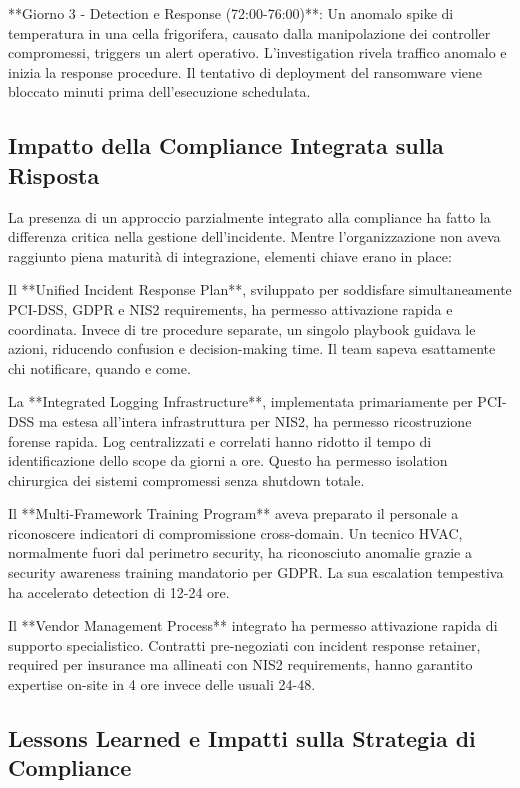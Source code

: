 **Giorno 3 - Detection e Response (72:00-76:00)**: Un anomalo spike di temperatura in una cella frigorifera, causato dalla manipolazione dei controller compromessi, triggers un alert operativo. L'investigation rivela traffico anomalo e inizia la response procedure. Il tentativo di deployment del ransomware viene bloccato minuti prima dell'esecuzione schedulata.

\subsection{Impatto della Compliance Integrata sulla Risposta}

La presenza di un approccio parzialmente integrato alla compliance ha fatto la differenza critica nella gestione dell'incidente. Mentre l'organizzazione non aveva raggiunto piena maturità di integrazione, elementi chiave erano in place:

Il **Unified Incident Response Plan**, sviluppato per soddisfare simultaneamente PCI-DSS, GDPR e NIS2 requirements, ha permesso attivazione rapida e coordinata. Invece di tre procedure separate, un singolo playbook guidava le azioni, riducendo confusion e decision-making time. Il team sapeva esattamente chi notificare, quando e come.

La **Integrated Logging Infrastructure**, implementata primariamente per PCI-DSS ma estesa all'intera infrastruttura per NIS2, ha permesso ricostruzione forense rapida. Log centralizzati e correlati hanno ridotto il tempo di identificazione dello scope da giorni a ore. Questo ha permesso isolation chirurgica dei sistemi compromessi senza shutdown totale.

Il **Multi-Framework Training Program** aveva preparato il personale a riconoscere indicatori di compromissione cross-domain. Un tecnico HVAC, normalmente fuori dal perimetro security, ha riconosciuto anomalie grazie a security awareness training mandatorio per GDPR. La sua escalation tempestiva ha accelerato detection di 12-24 ore.

Il **Vendor Management Process** integrato ha permesso attivazione rapida di supporto specialistico. Contratti pre-negoziati con incident response retainer, required per insurance ma allineati con NIS2 requirements, hanno garantito expertise on-site in 4 ore invece delle usuali 24-48.

\subsection{Lessons Learned e Impatti sulla Strategia di Compliance}

